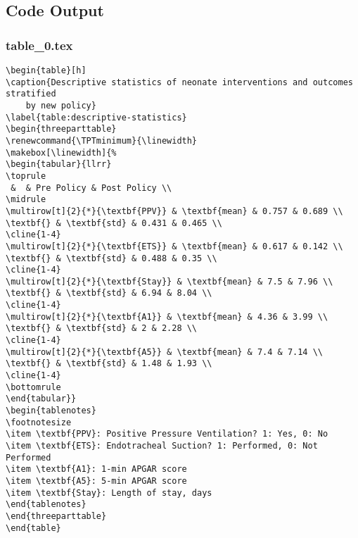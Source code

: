 \documentclass[11pt]{article}
\begin{document}
\subsection{Code Output}

\subsubsection*{table\_0.tex}

\begin{Verbatim}[tabsize=4]
\begin{table}[h]
\caption{Descriptive statistics of neonate interventions and outcomes stratified
	by new policy}
\label{table:descriptive-statistics}
\begin{threeparttable}
\renewcommand{\TPTminimum}{\linewidth}
\makebox[\linewidth]{%
\begin{tabular}{llrr}
\toprule
 &  & Pre Policy & Post Policy \\
\midrule
\multirow[t]{2}{*}{\textbf{PPV}} & \textbf{mean} & 0.757 & 0.689 \\
\textbf{} & \textbf{std} & 0.431 & 0.465 \\
\cline{1-4}
\multirow[t]{2}{*}{\textbf{ETS}} & \textbf{mean} & 0.617 & 0.142 \\
\textbf{} & \textbf{std} & 0.488 & 0.35 \\
\cline{1-4}
\multirow[t]{2}{*}{\textbf{Stay}} & \textbf{mean} & 7.5 & 7.96 \\
\textbf{} & \textbf{std} & 6.94 & 8.04 \\
\cline{1-4}
\multirow[t]{2}{*}{\textbf{A1}} & \textbf{mean} & 4.36 & 3.99 \\
\textbf{} & \textbf{std} & 2 & 2.28 \\
\cline{1-4}
\multirow[t]{2}{*}{\textbf{A5}} & \textbf{mean} & 7.4 & 7.14 \\
\textbf{} & \textbf{std} & 1.48 & 1.93 \\
\cline{1-4}
\bottomrule
\end{tabular}}
\begin{tablenotes}
\footnotesize
\item \textbf{PPV}: Positive Pressure Ventilation? 1: Yes, 0: No
\item \textbf{ETS}: Endotracheal Suction? 1: Performed, 0: Not Performed
\item \textbf{A1}: 1-min APGAR score
\item \textbf{A5}: 5-min APGAR score
\item \textbf{Stay}: Length of stay, days
\end{tablenotes}
\end{threeparttable}
\end{table}

\end{Verbatim}
\end{document}
